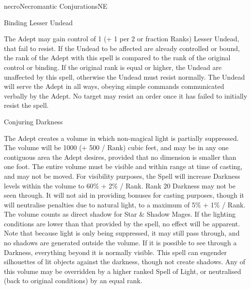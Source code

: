 \begin{college}[1.1]{necro}{Necromantic Conjurations}{NE}
\begin{spell}[G-2]{Binding Lesser Undead}
\begin{effects}
The Adept may gain control of 1 (+ 1 per 2 or fraction Ranks) Lesser
Undead, that fail to resist.  If the Undead to be affected are already
controlled or bound, the rank of the Adept with this spell is compared
to the rank of the original control or binding.  If the original rank
is equal or higher, the Undead are unaffected by this spell, otherwise
the Undead must resist normally.  The Undead will serve the Adept in
all ways, obeying simple commands communicated verbally by the Adept.
No target may resist an order once it has failed to initially resist
the spell.
\end{effects}
\end{spell}

\begin{spell}[G-3]{Conjuring Darkness}

\begin{effects}
The Adept creates a volume in which non-magical light is partially
suppressed. The volume will be 1000 (+ 500 / Rank) cubic feet, and may
be in any one contiguous area the Adept desires, provided that no
dimension is smaller than one foot. The entire volume must be visible
and within range at time of casting, and may not be moved. For
visibility purposes, the Spell will increase Darkness levels within
the volume to 60\% + 2\% / Rank. Rank 20 Darkness may not be seen
through. It will not aid in providing bonuses for casting purposes,
though it will neutralise penalties due to natural light, to a maximum
of 5\% + 1\% / Rank. The volume counts as direct shadow for Star \&
Shadow Mages. If the lighting conditions are lower than that provided
by the spell, no effect will be apparent. Note that because light is
only being suppressed, it may still pass through, and no shadows are
generated outside the volume. If it is possible to see through a
Darkness, everything beyond it is normally visible.  This spell can
engender silhouettes of lit objects against the darkness, though not
create shadows. Any of this volume may be overridden by a higher
ranked Spell of Light, or neutralised (back to original conditions) by
an equal rank.
\end{effects}
\end{spell}


\end{college}
